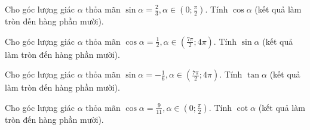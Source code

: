 \documentclass[12pt,a4paper]{article}
\begin{document}
\begin{ex}
 Cho góc lượng giác $\alpha$ thỏa mãn $\sin \alpha=\frac{2}{3}, \alpha \in \left( 0;\frac{\pi}{2} \right)$. Tính $\cos\alpha$ (kết quả làm tròn đến hàng phần mười).\\ 

\end{ex}

\begin{ex}
 Cho góc lượng giác $\alpha$ thỏa mãn $\cos \alpha=\frac{1}{2}, \alpha \in \left( \frac{7 \pi}{2}; 4\pi \right)$. Tính $\sin\alpha$ (kết quả làm tròn đến hàng phần mười).\\ 

\end{ex}

\begin{ex}
 Cho góc lượng giác $\alpha$ thỏa mãn $\sin \alpha=- \frac{1}{6}, \alpha \in \left( \frac{7 \pi}{2}; 4\pi \right)$. Tính $\tan\alpha$ (kết quả làm tròn đến hàng phần mười).\\ 

\end{ex}

\begin{ex}
 Cho góc lượng giác $\alpha$ thỏa mãn $\cos \alpha=\frac{9}{11}, \alpha \in \left( 0;\frac{\pi}{2} \right)$. Tính $\cot\alpha$ (kết quả làm tròn đến hàng phần mười).\\ 

\end{ex}
\end{document}
